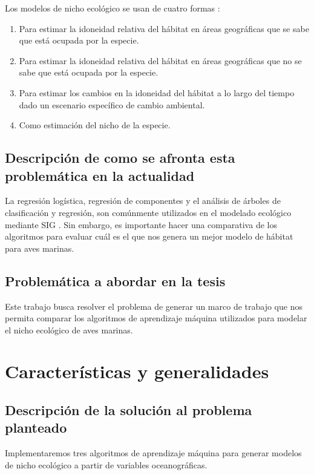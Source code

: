 Los modelos de nicho ecológico se usan de cuatro formas \cite{warren2011ecological}:

\begin{enumerate}
\item Para estimar la idoneidad relativa del hábitat en áreas geográficas que se
sabe que está ocupada por la especie.
\item Para estimar la idoneidad relativa del hábitat en áreas geográficas que no
se sabe que está ocupada por la especie.
\item Para estimar los cambios en la idoneidad del hábitat a lo largo del
tiempo dado un escenario específico de cambio ambiental.
\item Como estimación del nicho de la especie.
\end{enumerate}


\subsection*{Descripción de como se afronta esta problemática en la actualidad}

La regresión logística, regresión de componentes y el análisis de árboles de
clasificación y regresión, son comúnmente utilizados en el modelado ecológico
mediante SIG \cite{munoz2004comparison}. Sin embargo, es importante hacer una
comparativa de los algoritmos para evaluar cuál es el que nos genera un mejor
modelo de hábitat para aves marinas.


\subsection*{Problemática a abordar en la tesis}

Este trabajo busca resolver el problema de generar un marco de trabajo que nos
permita comparar los algoritmos de aprendizaje máquina utilizados para modelar
el nicho ecológico de aves marinas.

\section*{Características y generalidades}
\subsection*{Descripción de la solución al problema planteado}

Implementaremos tres algoritmos de aprendizaje máquina para generar modelos de
nicho ecológico a partir de variables oceanográficas. 

